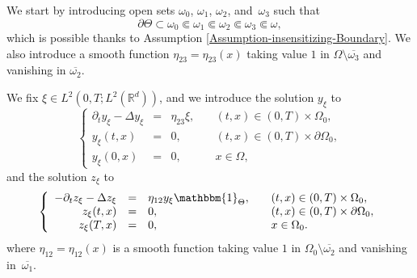\documentclass[10pt,a4paper]{amsart}
\newcommand\R{{\mathbb R}}
\theoremstyle{definition}
\begin{document}
We start by introducing open sets $\omega_0$, $\omega_1$, $\omega_2$, and~$\omega_3$ such that
\begin{equation*}
\partial \Theta \subset \omega_0 \Subset \omega_1 \Subset \omega_2 \Subset \omega_3 \Subset \omega,
\end{equation*}
which is possible thanks to Assumption \eqref{Assumption-insensitizing-Boundary}.
We also introduce a smooth function $\eta_{23} = \eta_{23}(x)$ taking value $1$ in $\Omega \setminus \overline{\omega_3}$ and vanishing in $\overline{\omega_2}$.

We fix $\xi \in L^2(0,T; L^2(\R^d))$, and we introduce the solution $y_\xi$ to
\begin{equation*}
\left\{
\begin{array}{rcll}
\partial_t y_\xi - \Delta y_\xi &=& \eta_{23} \xi, \quad & (t,x) \in (0,T) \times \Omega_0,
\\
y_\xi(t, x) &=& 0, \quad & (t,x) \in (0,T) \times \partial \Omega_0,
\\
y_\xi(0,x) &=& 0, \quad & x \in \Omega,
\end{array}
\right.
\end{equation*}
and the solution $z_\xi$ to
\begin{equation}
\label{Heat-Eq-Adjoint-z-f}
\left\{
\begin{array}{rcll}
- \partial_t z_\xi - \Delta z_\xi & =& \eta_{12} y_\xi \mathbbm{1}_{\Theta}, \quad & (t,x) \in (0,T) \times \Omega_0,
\\
z_\xi(t, x) &=& 0, \quad & (t,x) \in (0,T) \times \partial \Omega_0,
\\
z_\xi(T,x) &=& 0, \quad & x \in \Omega_0.
\end{array}
\right.
\end{equation}
where $\eta_{12} \!=\! \eta_{12}(x)$ is a smooth function taking value $1$ in $\Omega_0 \setminus \overline{\omega_2}$ and vanishing in~$\overline{\omega_1}$.
\end{document}
